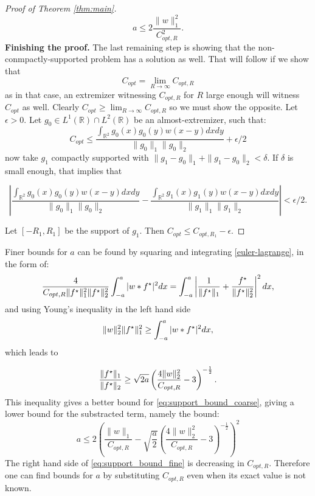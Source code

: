 \begin{proof}[Proof of Theorem \ref{thm:main}]
	\begin{equation}
		a \le 2 \frac  {\|w\|_1^2 }{C_{opt,R}^2}. 
	\end{equation}
	\textbf{Finishing the proof.}
The last remaining step is showing that the non-conmpactly-supported problem has a solution as well. That will follow if we show that
	\begin{equation}
	    C_{opt} = \lim_{R\to\infty} C_{opt,R}
	\end{equation}
	as in that case, an extremizer witnessing $C_{opt,R}$ for $R$ large enough will witness $C_{opt}$ as well. Clearly $C_{opt} \ge \lim_{R\to\infty} C_{opt,R}$ so we must show the opposite. Let $\epsilon>0$. Let $g_0\in L^1(\mathbb{R})\cap L^2(\mathbb{R})$ be an almost-extremizer, such that:
	\[
	C_{opt}\le \frac{\int_{\mathbb R^2} g_0(x)g_0(y)w(x-y) dx dy }{\|g_0\|_1\|g_0\|_2} + \epsilon/2
	\]
	now take $g_1$ compactly supported with $\|g_1-g_0\|_{1}+\|g_1-g_0\|_{2} <\delta$. If $\delta$ is small enough, that implies that
	
	\[
	\left|
	\frac{\int_{\mathbb R^2} g_0(x)g_0(y)w(x-y) dx dy }{\|g_0\|_1\|g_0\|_2}
	-
	\frac{\int_{\mathbb R^2} g_1(x)g_1(y)w(x-y) dx dy }{\|g_1\|_1\|g_1\|_2}
	\right| < \epsilon/2.
	\]
	
	Let $[-R_1,R_1]$ be the support of $g_1$. Then $C_{opt} \le C_{opt,R_1}-\epsilon$.
	\end{proof}

\begin{remark}
	Finer bounds for $a$ can be found by squaring and integrating \eqref{euler-lagrange}, in the form of:
	\[
		\frac{4}
			 {C_{opt,R}\|f^\star\|_1^2\|f^\star\|_2^2} 
		\int_{-a}^a |w*f^\star|^2  dx =
				\int_{-a}^a \left |
			\frac{1}{\|f^\star\|_1}+\frac{f^\star}{\|f^\star\|_2^2}
		\right |^2 dx,
	\]
and using Young's inequality in the left hand side 
\begin{align*}
	{\|w\|^2_2\|f^\star\|^2_1}
		\geq  
		\int_{-a}^a |w*f^\star|^2  dx, 
\end{align*}
which leads to

	\[
	\frac{\|f^\star\|_1}{\|f^\star\|_2} 
	\ge
	\sqrt{2a} \left(\frac{4 \|w\|_2^2}{C_{opt,R}} - 3\right)^{- \frac 1 2}.
	\]
	This inequality gives a better bound for \eqref{eq:support_bound_coarse}, giving a lower bound for the substracted term, namely the bound:
	\begin{equation}
	\label{eq:support_bound_fine}
	a \le  
	2\left (
		\frac{\|w\|_1}{C_{opt,R}}
			- 
		\sqrt{\frac{a}2} 
		\left(
			\frac{4 \|w\|_2^2}
				 {C_{opt,R}} - 3
		\right)^{- \frac 1 2} 
	\right )^2
	\end{equation}
	The right hand side of \eqref{eq:support_bound_fine} is decreasing in $C_{opt,R}$. Therefore one can find bounds for $a$ by substituting $C_{opt,R}$ even when its exact value is not known.
\end{remark}
